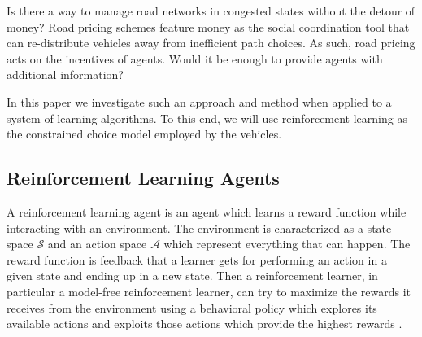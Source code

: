 Is there a way to manage road networks in congested states without the detour of money? Road pricing schemes feature money as the social coordination tool that can re-distribute vehicles away from inefficient path choices. As such, road pricing acts on the 
incentives of agents. Would it be enough to provide agents with additional information? 


In this paper we investigate such an approach and method when applied to a system of learning algorithms. To this end, we will use reinforcement learning as the constrained choice model employed by the vehicles.


\subsection{Reinforcement Learning Agents}
\label{sec:stateless}
A reinforcement learning agent is an agent which learns a reward function while interacting with an environment. The environment is characterized as a state space $\mathcal{S}$ and an action space $\mathcal{A}$ which represent everything that can happen. The reward function is feedback that a learner gets for performing an action in a given state and ending up in a new state. Then a reinforcement learner, in particular a model-free reinforcement learner, can try to maximize the rewards it receives from the environment using a behavioral policy which explores its available actions and exploits those actions which provide the highest rewards \cite{sutton2018reinforcement}.

